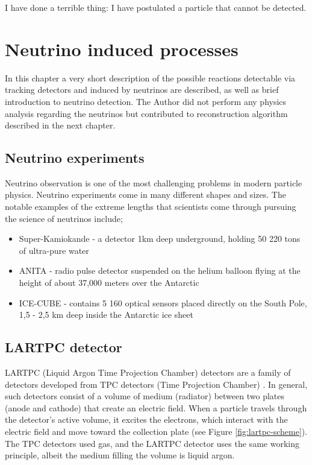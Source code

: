 \begin{savequote}[75mm]
I have done a terrible thing: I have postulated a particle that cannot be detected.
\end{savequote}

\chapter{Neutrino induced processes}
\label{sec:neu_dec}

In this chapter a very short description of the possible reactions detectable via tracking detectors and induced by neutrinos are described, as well as brief introduction to neutrino detection. 
The Author did not perform any physics analysis regarding the neutrinos but 
contributed to reconstruction algorithm described in the next chapter.

\section{Neutrino experiments}
Neutrino observation is one of the most challenging problems in modern particle physics.
Neutrino experiments come in many different shapes and sizes.
The notable examples of the extreme lengths that scientists come through pursuing the science of neutrinos include;

\begin{itemize}
\item Super-Kamiokande\cite{FUKUDA2003418} - a detector 1km deep underground, holding 50 220 tons of ultra-pure water
\item ANITA\cite{0503304} - radio pulse detector suspended on the helium balloon flying at the height of about 37,000 meters over the Antarctic
\item ICE-CUBE\cite{Abbasi_2009} - contains 5 160 optical sensors placed directly on the South Pole, 1,5 - 2,5 km deep inside the Antarctic ice sheet
\end{itemize}

\section{LARTPC detector}
LARTPC (Liquid Argon Time Projection Chamber) \cite{Rubbia:117852} detectors are a family of detectors developed from TPC detectors (Time Projection Chamber) \cite{osti_6545918}.
In general, such detectors consist of a volume of medium (radiator) between two plates (anode and cathode) that create an electric field.
When a particle travels through the detector's active volume, it excites the electrons, which interact with the electric field and move toward the collection plate (see Figure \ref{fig:lartpc-scheme}).
The TPC detectors used gas, and the LARTPC detector uses the same working principle, albeit the medium filling the volume is liquid argon.

